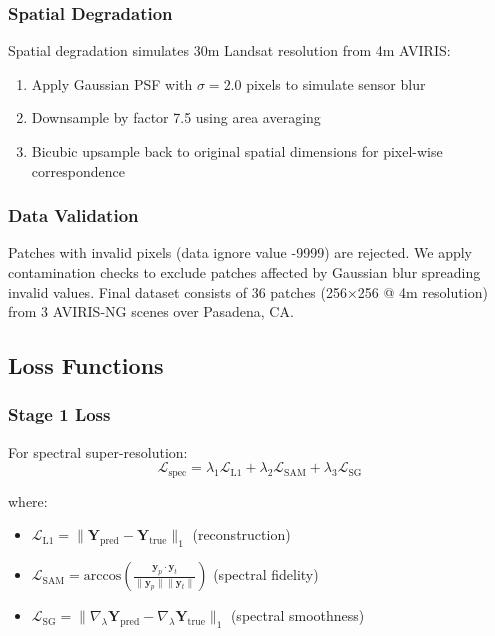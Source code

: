 \documentclass[]{spieman}
\begin{document}
\subsubsection{Spatial Degradation}

Spatial degradation simulates 30m Landsat resolution from 4m AVIRIS:
\begin{enumerate}
\item Apply Gaussian PSF with $\sigma=2.0$ pixels to simulate sensor blur
\item Downsample by factor 7.5 using area averaging
\item Bicubic upsample back to original spatial dimensions for pixel-wise correspondence
\end{enumerate}

\subsubsection{Data Validation}

Patches with invalid pixels (data ignore value -9999) are rejected. We apply contamination checks to exclude patches affected by Gaussian blur spreading invalid values. Final dataset consists of 36 patches (256×256 @ 4m resolution) from 3 AVIRIS-NG scenes over Pasadena, CA.

\subsection{Loss Functions}

\subsubsection{Stage 1 Loss}

For spectral super-resolution:
\begin{equation}
\mathcal{L}_{\text{spec}} = \lambda_1 \mathcal{L}_{\text{L1}} + \lambda_2 \mathcal{L}_{\text{SAM}} + \lambda_3 \mathcal{L}_{\text{SG}}
\end{equation}

where:
\begin{itemize}
\item $\mathcal{L}_{\text{L1}} = \|\mathbf{Y}_{\text{pred}} - \mathbf{Y}_{\text{true}}\|_1$ (reconstruction)
\item $\mathcal{L}_{\text{SAM}} = \text{arccos}\left(\frac{\mathbf{y}_p \cdot \mathbf{y}_t}{\|\mathbf{y}_p\| \|\mathbf{y}_t\|}\right)$ (spectral fidelity)
\item $\mathcal{L}_{\text{SG}} = \|\nabla_\lambda \mathbf{Y}_{\text{pred}} - \nabla_\lambda \mathbf{Y}_{\text{true}}\|_1$ (spectral smoothness)
\end{itemize}
\end{document}
